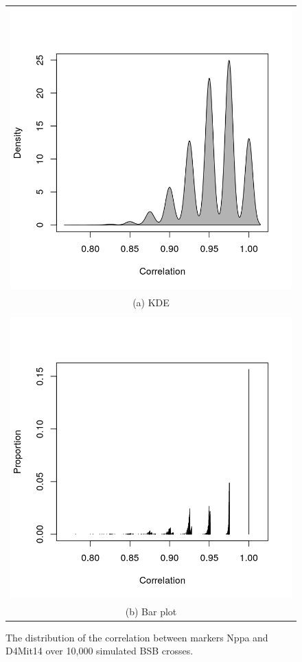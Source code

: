 \documentclass[sts]{imsart}
\begin{document}
\begin{figure}[htp]
  \begin{center}
    \begin{tabular}{c}
      \includegraphics[scale = 0.5]{../img/strngDen.png} \\
      {\footnotesize (a) KDE} \\
      \\
      \includegraphics[scale = 0.5]{../img/strngBarNoCol.png} \\
      {\footnotesize (b) Bar plot}
    \end{tabular}
  \end{center}
  \caption{The distribution of the correlation between markers Nppa and D4Mit14 over 10,000 simulated BSB crosses.}
  \label{fig:discrete}
\end{figure}
\end{document}
